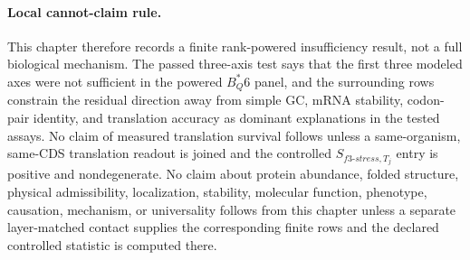 \paragraph{Local cannot-claim rule.}
This chapter therefore records a finite rank-powered insufficiency result, not a full biological mechanism.  The passed three-axis test says that the first three modeled axes were not sufficient in the powered $B^*_Q6$ panel, and the surrounding rows constrain the residual direction away from simple GC, mRNA stability, codon-pair identity, and translation accuracy as dominant explanations in the tested assays.  No claim of measured translation survival follows unless a same-organism, same-CDS translation readout is joined and the controlled $S_{f3\text{-}stress,T_j}$ entry is positive and nondegenerate.  No claim about protein abundance, folded structure, physical admissibility, localization, stability, molecular function, phenotype, causation, mechanism, or universality follows from this chapter unless a separate layer-matched contact supplies the corresponding finite rows and the declared controlled statistic is computed there.